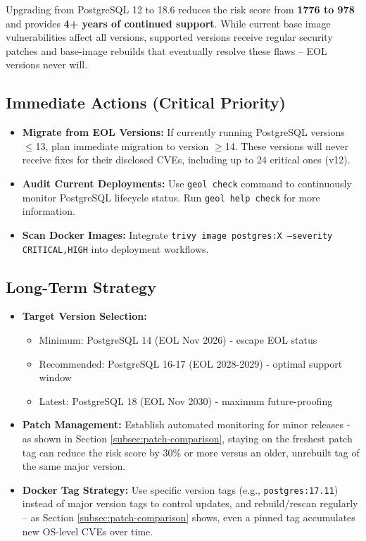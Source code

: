 \documentclass[11pt, a4paper]{article}
\begin{document}
\begin{tcolorbox}[colback=lightorange!20, colframe=vuln-high, title=💡 Business Case for Migration, fonttitle=\bfseries]
Upgrading from PostgreSQL 12 to 18.6 reduces the risk score from \textbf{1776 to 978} and provides \textbf{4+ years of continued support}. While current base image vulnerabilities affect all versions, supported versions receive regular security patches and base-image rebuilds that eventually resolve these flaws -- EOL versions never will.
\end{tcolorbox}
\subsection{Immediate Actions (Critical Priority)}

\begin{itemize}
    \item \textbf{Migrate from EOL Versions:} If currently running PostgreSQL versions $\leq$13, plan immediate migration to version $\geq$14. These versions will never receive fixes for their disclosed CVEs, including up to 24 critical ones (v12).
    \item \textbf{Audit Current Deployments:} Use \texttt{geol check} command to continuously monitor PostgreSQL lifecycle status. Run \texttt{geol help check} for more information.
    \item \textbf{Scan Docker Images:} Integrate \texttt{trivy image postgres:X --severity CRITICAL,HIGH} into deployment workflows.
\end{itemize}

\subsection{Long-Term Strategy}

\begin{itemize}
    \item \textbf{Target Version Selection:}
    \begin{itemize}
        \item Minimum: PostgreSQL 14 (EOL Nov 2026) - escape EOL status
        \item Recommended: PostgreSQL 16-17 (EOL 2028-2029) - optimal support window
        \item Latest: PostgreSQL 18 (EOL Nov 2030) - maximum future-proofing
    \end{itemize}
    \item \textbf{Patch Management:} Establish automated monitoring for minor releases - as shown in Section \ref{subsec:patch-comparison}, staying on the freshest patch tag can reduce the risk score by 30\% or more versus an older, unrebuilt tag of the same major version.
    \item \textbf{Docker Tag Strategy:} Use specific version tags (e.g., \texttt{postgres:17.11}) instead of major version tags to control updates, and rebuild/rescan regularly -- as Section \ref{subsec:patch-comparison} shows, even a pinned tag accumulates new OS-level CVEs over time.
\end{itemize}
\end{document}
